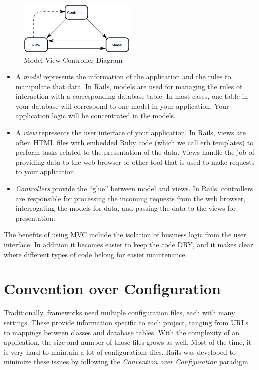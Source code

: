 \begin{figure}[h!]
  \caption{Model-View-Controller Diagram}
  \centering
  \includegraphics[width=0.5\textwidth]{Images/ModelViewController}
\end{figure}

\begin{itemize}
\item A \emph{model} represents the information of the application and the rules to manipulate that data. In Rails, models are used for managing the rules of interaction with a corresponding database table. In most cases, one table in your database will correspond to one model in your application. Your application logic will be concentrated in the models.
\item A \emph{view} represents the user interface of your application. In Rails, views are often HTML files with embedded Ruby code (which we call erb templates) to perform tasks related to the presentation of the data. Views handle the job of providing data to the web browser or other tool that is used to make requests to your application.
\item \emph{Controllers} provide the “glue” between model and views. In Rails, controllers are responsible for processing the incoming requests from the web browser, interrogating the models for data, and passing the data to the views for presentation.
\end{itemize}

The benefits of using MVC include the isolation of business logic from the user interface.
In addition it becomes easier to keep the code DRY, and 
it makes clear where different types of code belong for easier maintenance.



\section{Convention over Configuration} 
Traditionally, frameworks need multiple configuration files, each with many settings. 
These provide information specific to each project, ranging from URLs to mappings between classes and database tables. 
With the complexity of an application, the size and number of those files grows as well. 
Most of the time, it is very hard to maintain a lot of configurations files. 
Rails was developed to minimize these issues by following the \emph{Convention over Configuration} paradigm.

